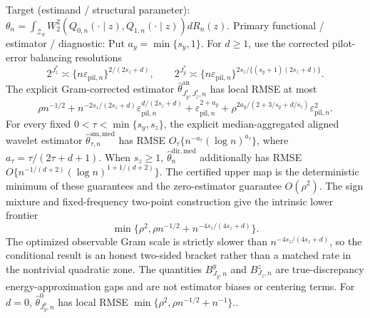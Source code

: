 \documentclass{article}
\begin{document}
Target (estimand / structural parameter): \(\theta_n=\int_{\mathcal Z_d}W_2^2(Q_{0,n}(\cdot\mid z),Q_{1,n}(\cdot\mid z))dR_n(z)\).
Primary functional / estimator / diagnostic: Put \(a_y=\min\{s_y,1\}\). For \(d\ge1\), use the corrected pilot-error balancing resolutions
\[
2^{J_z^*}\asymp\{n\varepsilon_{\mathrm{pil},n}\}^{2/(2s_z+d)},
\qquad
2^{J_y^*}\asymp\{n\varepsilon_{\mathrm{pil},n}\}^{2s_z/\{(s_y+1)(2s_z+d)\}}.
\]
The explicit Gram-corrected estimator \(\widehat\theta^{\mathrm{an}}_{J_y^*,J_z^*,n}\) has local RMSE at most
\[
\rho n^{-1/2}
+n^{-2s_z/(2s_z+d)}\varepsilon_{\mathrm{pil},n}^{d/(2s_z+d)}
+\varepsilon_{\mathrm{pil},n}^{2+a_y}
+\rho^{2a_y/(2+3/s_y+d/s_z)}\varepsilon_{\mathrm{pil},n}^2.
\]
For every fixed \(0<\tau<\min\{s_y,s_z\}\), the explicit median-aggregated aligned wavelet estimator \(\widehat\theta^{\mathrm{sm,med}}_{\tau,n}\) has RMSE \(O_\tau\{n^{-a_\tau}(\log n)^{a_\tau}\}\), where \(a_\tau=\tau/(2\tau+d+1)\). When \(s_z\ge1\), \(\widehat\theta_n^{\mathrm{dir,med}}\) additionally has RMSE \(O\{n^{-1/(d+2)}(\log n)^{1+1/(d+2)}\}\). The certified upper map is the deterministic minimum of these guarantees and the zero-estimator guarantee \(O(\rho^2)\). The sign mixture and fixed-frequency two-point construction give the intrinsic lower frontier
\[
\min\{\rho^2,\rho n^{-1/2}+n^{-4s_z/(4s_z+d)}\}.
\]
The optimized observable Gram scale is strictly slower than \(n^{-4s_z/(4s_z+d)}\), so the conditional result is an honest two-sided bracket rather than a matched rate in the nontrivial quadratic zone.  The quantities \(B^y_{J_y,n}\) and \(B^z_{J_z,n}\) are true-discrepancy energy-approximation gaps and are not estimator biases or centering terms. For \(d=0\), \(\widehat\theta^0_{J_y^0,n}\) has local RMSE \(\min\{\rho^2,\rho n^{-1/2}+n^{-1}\}\)..
\end{document}
